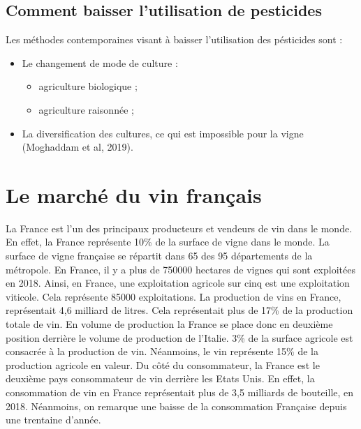 \documentclass[11pt,]{article}
\providecommand{\tightlist}{%
  \setlength{\itemsep}{0pt}\setlength{\parskip}{0pt}}
\begin{document}
\hypertarget{comment-baisser-lutilisation-de-pesticides}{%
\subsection{Comment baisser l'utilisation de
pesticides}\label{comment-baisser-lutilisation-de-pesticides}}

Les méthodes contemporaines visant à baisser l'utilisation des
pésticides sont :

\begin{itemize}
\tightlist
\item
  Le changement de mode de culture :

  \begin{itemize}
  \tightlist
  \item
    agriculture biologique ;
  \item
    agriculture raisonnée ;
  \end{itemize}
\item
  La diversification des cultures, ce qui est impossible pour la vigne
  (Moghaddam et al, 2019).
\end{itemize}

\hypertarget{le-marche-du-vin-francais}{%
\section{Le marché du vin français}\label{le-marche-du-vin-francais}}

\FloatBarrier

La France est l'un des principaux producteurs et vendeurs de vin dans le
monde. En effet, la France représente 10\% de la surface de vigne dans
le monde. La surface de vigne française se répartit dans 65 des 95
départements de la métropole. En France, il y a plus de 750000 hectares
de vignes qui sont exploitées en 2018. Ainsi, en France, une
exploitation agricole sur cinq est une exploitation viticole. Cela
représente 85000 exploitations. La production de vins en France,
représentait 4,6 milliard de litres. Cela représentait plus de 17\% de
la production totale de vin. En volume de production la France se place
donc en deuxième position derrière le volume de production de l'Italie.
3\% de la surface agricole est consacrée à la production de vin.
Néanmoins, le vin représente 15\% de la production agricole en valeur.
Du côté du consommateur, la France est le deuxième pays consommateur de
vin derrière les Etats Unis. En effet, la consommation de vin en France
représentait plus de 3,5 milliards de bouteille, en 2018. Néanmoins, on
remarque une baisse de la consommation Française depuis une trentaine
d'année.
\end{document}
